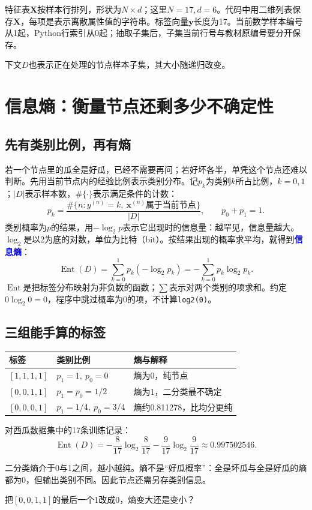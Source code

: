 \documentclass[UTF8,a4paper,11pt,fontset=fandol]{ctexart}
\numberwithin{equation}{subsection}
\newcommand{\term}[1]{\textcolor{Blue}{\textbf{#1}}}
\begin{document}
特征表$\mathbf X$按样本行排列，形状为$N\times d$；这里$N=17,d=6$。代码中用二维列表保存$\mathbf X$，每项是表示离散属性值的字符串。标签向量$\mathbf y$长度为17。当前数学样本编号从1起，Python行索引从0起；抽取子集后，子集当前行号与教材原编号要分开保存。

下文$D$也表示正在处理的节点样本子集，其大小随递归改变。

\clearpage
\section{信息熵：衡量节点还剩多少不确定性}
\subsection{先有类别比例，再有熵}
若一个节点里的瓜全是好瓜，已经不需要再问；若好坏各半，单凭这个节点还难以判断。先用当前节点内的经验比例表示类别分布。记$p_k$为类别$k$所占比例，$k=0,1$；$|D|$表示样本数，$\#\{\cdot\}$表示满足条件的计数：
\begin{equation}
p_k=\frac{\#\{n:y^{(n)}=k,\ \mathbf x^{(n)}\text{属于当前节点}\}}{|D|},
\qquad p_0+p_1=1.
\end{equation}
类别概率为$p$的结果，用$-\log_2p$表示它出现时的信息量：越罕见，信息量越大。$\log_2$是以2为底的对数，单位为比特（bit）。按结果出现的概率求平均，就得到\term{信息熵}：
\begin{equation}
\operatorname{Ent}(D)=\sum_{k=0}^{1}p_k(-\log_2p_k)
=-\sum_{k=0}^{1}p_k\log_2p_k.
\end{equation}
$\operatorname{Ent}$是把标签分布映射为非负数的函数；$\sum$表示对两个类别的项求和。约定$0\log_2 0=0$，程序中跳过概率为0的项，不计算\texttt{log2(0)}。

\subsection{三组能手算的标签}
\par\noindent\begin{tabularx}{\textwidth}{L{3.1cm}L{3.2cm}Y}
\toprule
标签 & 类别比例 & 熵与解释\\
\midrule
$[1,1,1,1]$ & $p_1=1,\ p_0=0$ & 熵为0，纯节点\\
$[0,0,1,1]$ & $p_1=p_0=1/2$ & 熵为1，二分类最不确定\\
$[0,0,0,1]$ & $p_1=1/4,\ p_0=3/4$ & 熵约0.811278，比均分更纯\\
\bottomrule
\end{tabularx}\par
对西瓜数据集中的17条训练记录：
\begin{equation}
\operatorname{Ent}(D)
=-\frac8{17}\log_2\frac8{17}-\frac9{17}\log_2\frac9{17}
\approx0.997502546.
\end{equation}
\begin{keybox}
二分类熵介于0与1之间，越小越纯。熵不是“好瓜概率”：全是坏瓜与全是好瓜的熵都为0，但输出类别不同。因此节点还需另存类别信息。
\end{keybox}
\begin{questionbox}[思考题4]
把$[0,0,1,1]$的最后一个1改成0，熵变大还是变小？
\end{questionbox}
\end{document}
